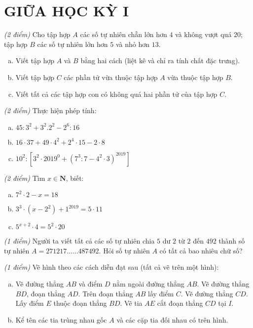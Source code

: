 \section{GIỮA HỌC KỲ I}
\setcounter{ex}{0}
\begin{ex}  \textit{(2 điểm)} Cho tập hợp $A$ các số tự nhiên chẵn lớn hơn $4$ và không vượt quá $20$; tập hợp $B$ các số tự nhiên lớn hơn $5$ và nhỏ hơn $13$.
\begin{enumerate}[a)]
\item Viết tập hợp $A$ và $B$ bằng hai cách (liệt kê và chỉ ra tính chất đặc trưng).
\item Viết tập hợp $C$ các phần tử vừa thuộc tập hợp $A$ vừa thuộc tập hợp $B$. 
\item Viết tất cả các tập hợp con có không quá hai phần tử của tập hợp $C$.

\end{enumerate}
\end{ex}     \begin{ex} \textit{(2 điểm)} Thực hiện phép tính:
\begin{enumerate} [a)]
\item $45:{3^2} + {3^2}{.2^2} - {2^6}:16$
\item $16 \cdot 37 + {49 \cdot 4^2} + {2^4} \cdot 15 - 2 \cdot 8$
\item ${10^2}:\left[ {{3^2} \cdot {{2019}^0} + {{\left( {{7^3}:7 - {4^2} \cdot 3} \right)}^{2019}}} \right]$ 

\end{enumerate}
\end{ex}     \begin{ex} \textit{(2 điểm)} Tìm $x \in \mathbf{N}$, biết:
 \begin{enumerate}[a)]
\item ${7^2} \cdot 2 - x = 18$
\item ${3^3} \cdot \left( {x - {2^2}} \right) + {1^{2019}} = 5 \cdot 11$
\item ${5^{x + 2}} \cdot 4 = {5^2} \cdot 20$ 

\end{enumerate}
\end{ex}     \begin{ex} \textit{(1 điểm)} Người ta viết tất cả các số tự nhiên chia $5$ dư $2$ từ $2$ đến $492$ thành số tự nhiên $A=271217……487492$. Hỏi số tự nhiên $A$ có tất cả bao nhiêu chữ số?\\
\end{ex}     \begin{ex} \textit{(1 điểm)} Vẽ hình theo các cách diễn đạt sau (tất cả vẽ trên một hình): 
 \begin{enumerate}[a)]
\item Vẽ đường thẳng $AB$ và điểm $D$ nằm ngoài đường thẳng $AB$. Vẽ đường thẳng $BD$, đoạn thẳng $AD$. Trên đoạn thẳng $AB$ lấy điểm $C$. Vẽ đường thẳng $CD$. Lấy điểm $E$ thuộc đoạn thẳng $BD$. Vẽ tia $AE$ cắt đoạn thẳng $CD$ tại $I$.
\item Kể tên các tia trùng nhau gốc $A$ và các cặp tia đối nhau có trên hình.


\end{enumerate}
\end{ex}
